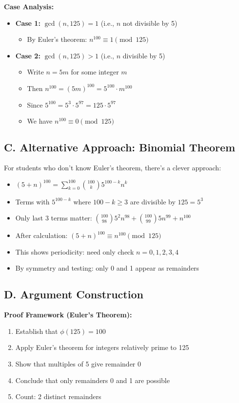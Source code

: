 \documentclass[12pt]{article}
\begin{document}
\begin{strategicbox}
\textbf{Case Analysis:}
\begin{itemize}
    \item \textbf{Case 1:} $\gcd(n, 125) = 1$ (i.e., $n$ not divisible by 5)
    \begin{itemize}
        \item By Euler's theorem: $n^{100} \equiv 1 \pmod{125}$
    \end{itemize}
    \item \textbf{Case 2:} $\gcd(n, 125) > 1$ (i.e., $n$ divisible by 5)
    \begin{itemize}
        \item Write $n = 5m$ for some integer $m$
        \item Then $n^{100} = (5m)^{100} = 5^{100} \cdot m^{100}$
        \item Since $5^{100} = 5^3 \cdot 5^{97} = 125 \cdot 5^{97}$
        \item We have $n^{100} \equiv 0 \pmod{125}$
    \end{itemize}
\end{itemize}

\subsection*{C. Alternative Approach: Binomial Theorem}

For students who don't know Euler's theorem, there's a clever approach:
\begin{itemize}
    \item $(5 + n)^{100} = \sum_{k=0}^{100} \binom{100}{k} 5^{100-k} n^k$
    \item Terms with $5^{100-k}$ where $100 - k \geq 3$ are divisible by $125 = 5^3$
    \item Only last 3 terms matter: $\binom{100}{98}5^2 n^{98} + \binom{100}{99}5 n^{99} + n^{100}$
    \item After calculation: $(5 + n)^{100} \equiv n^{100} \pmod{125}$
    \item This shows periodicity: need only check $n = 0, 1, 2, 3, 4$
    \item By symmetry and testing: only 0 and 1 appear as remainders
\end{itemize}

\subsection*{D. Argument Construction}

\textbf{Proof Framework (Euler's Theorem):}
\begin{enumerate}
    \item Establish that $\phi(125) = 100$
    \item Apply Euler's theorem for integers relatively prime to 125
    \item Show that multiples of 5 give remainder 0
    \item Conclude that only remainders 0 and 1 are possible
    \item Count: 2 distinct remainders
\end{enumerate}
\end{strategicbox}
\end{document}
